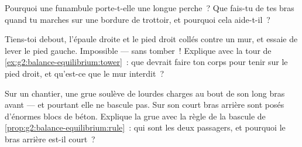 \begin{exercise}[$\star$]\label{exo:g2:balance-equilibrium:8}
Pourquoi une funambule porte-t-elle une longue perche~? Que fais-tu
de tes bras quand tu marches sur une bordure de trottoir, et pourquoi
cela aide-t-il~?
\end{exercise}

\begin{exercise}[$\star$]\label{exo:g2:balance-equilibrium:9}
Tiens-toi debout, l'épaule droite et le pied droit collés contre un
mur, et essaie de lever le pied gauche. Impossible --- sans tomber~!
Explique avec la tour de \cref{ex:g2:balance-equilibrium:tower}~: que
devrait faire ton corps pour tenir  sur le pied droit, et
qu'est-ce que le mur interdit~?
\end{exercise}

\begin{exercise}[$\star\star$]\label{exo:g2:balance-equilibrium:10}
Sur un chantier, une grue soulève de lourdes charges au bout de son
long bras avant --- et pourtant elle ne bascule pas. Sur son court
bras arrière sont posés d'énormes blocs de béton. Explique la grue
avec la règle de la bascule de
\cref{prop:g2:balance-equilibrium:rule}~: qui sont les deux
passagers, et pourquoi le bras arrière est-il court~?
\end{exercise}
